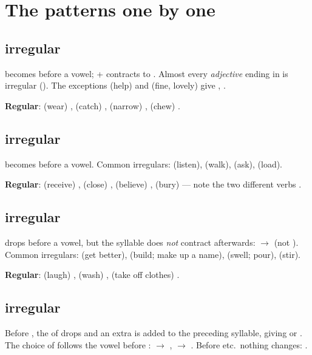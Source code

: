 \section{The patterns one by one}

\subsection{ irregular}

 becomes  before a vowel;  +  contracts to . Almost
every \emph{adjective} ending in  is irregular (). The exceptions  (help) and
 (fine, lovely) give , .

\textbf{Regular}:  (wear) ,  (catch) ,
 (narrow) ,  (chew) .

\subsection{ irregular}

 becomes  before a vowel. Common irregulars:  (listen), 
(walk),  (ask),  (load).

\textbf{Regular}:  (receive) ,  (close) ,
 (believe) ,  (bury)  --- note the two different
verbs .

\subsection{ irregular}

 drops before a vowel, but the syllable does \emph{not} contract afterwards:
 $\to$  (not ). Common irregulars:  (get
better),  (build; make up a name),  (swell; pour),  (stir).

\textbf{Regular}:  (laugh) ,  (wash) ,
 (take off clothes) .

\subsection{ irregular}

Before , the  of  drops and an extra  is added to the
preceding syllable, giving  or . The choice of  follows the
vowel before :  $\to$ ,  $\to$ .
Before  etc.\ nothing changes: .

